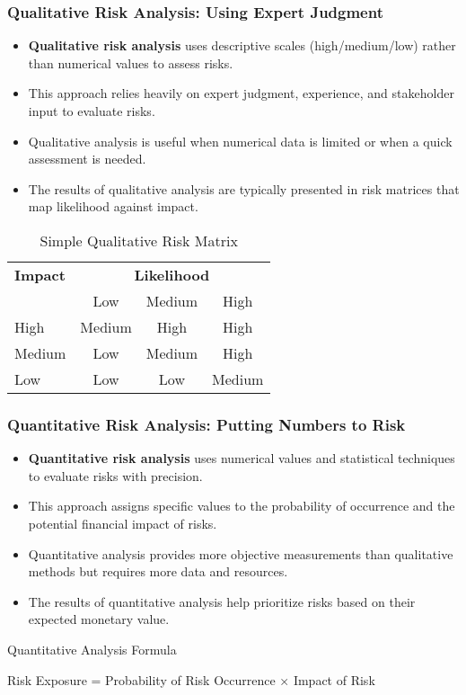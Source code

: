 \documentclass{beamer}
\begin{document}
  \begin{frame}
  \frametitle{Qualitative Risk Analysis: Using Expert Judgment}
  \begin{itemize}
    \item \textbf{Qualitative risk analysis} uses descriptive scales (high/medium/low) rather than numerical values to assess risks.
    \item This approach relies heavily on expert judgment, experience, and stakeholder input to evaluate risks.
    \item Qualitative analysis is useful when numerical data is limited or when a quick assessment is needed.
    \item The results of qualitative analysis are typically presented in risk matrices that map likelihood against impact.
  \end{itemize}
  
  \begin{table}
  \centering
  \begin{tabular}{l|ccc}
  \textbf{Impact} & \multicolumn{3}{c}{\textbf{Likelihood}} \\
   & Low & Medium & High \\
  \hline
  High & Medium & High & High \\
  Medium & Low & Medium & High \\
  Low & Low & Low & Medium \\
  \end{tabular}
  \caption{Simple Qualitative Risk Matrix}
  \end{table}
  \end{frame}
  
  \begin{frame}
    \frametitle{Quantitative Risk Analysis: Putting Numbers to Risk}
    \begin{itemize}
      \item \textbf{Quantitative risk analysis} uses numerical values and statistical techniques to evaluate risks with precision.
      \item This approach assigns specific values to the probability of occurrence and the potential financial impact of risks.
      \item Quantitative analysis provides more objective measurements than qualitative methods but requires more data and resources.
      \item The results of quantitative analysis help prioritize risks based on their expected monetary value.
    \end{itemize}
    
    \begin{exampleblock}{Quantitative Analysis Formula}
    \begin{center}
    Risk Exposure = Probability of Risk Occurrence × Impact of Risk
    \end{center}
    \end{exampleblock}
    \end{frame}
    
\end{document}
